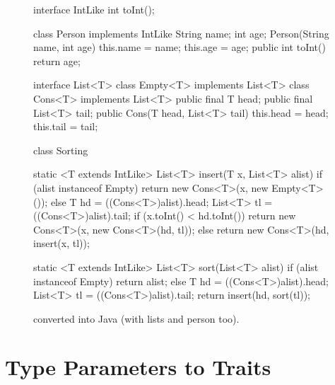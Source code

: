\documentclass[9pt]{extbook}
\begin{document}
\begin{figure}
\begin{javacode}
interface IntLike {
  int toInt();
}

class Person implements IntLike {
  String name;
  int age;
  Person(String name, int age) { this.name = name; this.age = age; }
  public int toInt() { return age; }
}

interface List<T>  { }
class Empty<T> implements List<T> { }
class Cons<T> implements List<T> {
  public final T head;
  public final List<T> tail;
  public Cons(T head, List<T> tail) {
    this.head = head;
    this.tail = tail;
  }
}

class Sorting {

  static <T extends IntLike> List<T> insert(T x, List<T> alist) {
    if (alist instanceof Empty) {
      return new Cons<T>(x, new Empty<T>());
    }
    else {
      T hd = ((Cons<T>)alist).head;
      List<T> tl = ((Cons<T>)alist).tail;
      if (x.toInt() < hd.toInt()) {
        return new Cons<T>(x, new Cons<T>(hd, tl));
      }
      else {
        return new Cons<T>(hd, insert(x, tl));
      }
    }
  }

  static <T extends IntLike> List<T> sort(List<T> alist) {
    if (alist instanceof Empty) {
      return alist;
    }
    else {
      T hd = ((Cons<T>)alist).head;
      List<T> tl = ((Cons<T>)alist).tail;
      return insert(hd, sort(tl));
    }
  }

}
\end{javacode}
\caption{ converted into Java (with lists and person too).}
\label{sorting_java_omg}
\end{figure}

\section{Type Parameters to Traits}
\end{document}
